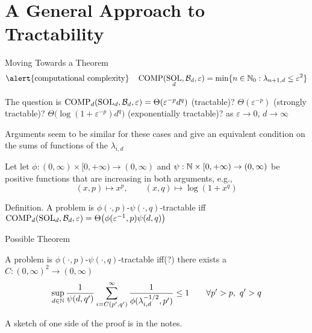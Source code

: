 \documentclass[11pt,compress,xcolor={usenames,dvipsnames},aspectratio=169]{beamer}
\DeclareMathOperator{\COMP}{COMP}
\DeclareMathOperator{\SOL}{SOL}
\begin{document}
\section{A General Approach to Tractability}
\begin{frame}{Moving Towards a Theorem}
    \vspace{-6ex}
    \[
    \text{\alert{computational complexity}\quad} \COMP(\SOL_d,\cb_d,\varepsilon) = \min \{n \in \natzero : \lambda_{n+1, d} \le \varepsilon^2\} 
    \]
    
    \vspace{-3ex}
   The question is $\COMP_d(\SOL_d,\cb_d,\varepsilon) = \Theta(\varepsilon^{-p} d^q)$ (tractable)? $\Theta(\varepsilon^{-p})$ (strongly tractable)? $\Theta\bigl(\log(1 + \varepsilon^{-p} ) d^q \bigr)$ (exponentially  tractable)?
   \hfill \hfill as $\varepsilon \to 0$, $d \to \infty$
   
   Arguments seem to be similar for these cases and give an equivalent condition on the sums of functions of the $\lambda_{i,d}$
 
   Let let $\phi : (0,\infty) \times [0,+\infty) \to (0,\infty)$ and $\psi : \mathbb{N}  \times [0,+\infty) \to (0,\infty)$ be positive functions that are increasing in both arguments, e.g., 
\[
(x,p) \mapsto x^{p}, \qquad (x,q) \mapsto \log(1+ x^q)
\]

\vspace{-3ex}
\alert{Definition.} A problem is $\phi(\cdot,p)$-$\psi(\cdot, q)$-tractable iff $\COMP_d(\SOL_d,\cb_d,\varepsilon) = \Theta\bigl(\phi(\varepsilon^{-1},p) \psi(d,q)  \bigr)$



\end{frame}

\begin{frame}{Possible Theorem}
\begin{theorem} A problem is $\phi(\cdot,p)$-$\psi(\cdot, q)$-tractable iff(?) there exists a  $C : (0,\infty)^2 \to (0,\infty)$
\begin{equation*}
    \sup_{d \in \mathbb{N}} \frac{1}{\psi(d,q')} \sum_{i = C(p',q')}^\infty \frac{1}{\phi(\lambda_{i, d}^{-1/2},p')} \le 1 \qquad \forall p' > p, \ q' > q
\end{equation*}
\end{theorem}

A sketch of one side of the proof is in the notes.

\end{frame}
\end{document}
